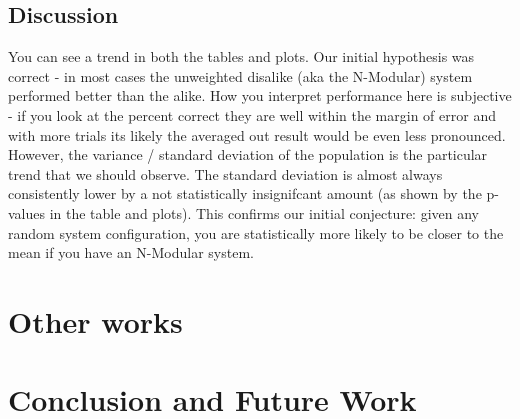 \documentclass[article]{IEEEtran}
\begin{document}
\subsection{Discussion}
\par You can see a trend in both the tables and plots. Our initial hypothesis was correct - in most cases the unweighted disalike (aka the N-Modular) system performed better than the alike. How you interpret performance here is subjective - if you look at the percent correct they are well within the margin of error and with more trials its likely the averaged out result would be even less pronounced. However, the variance / standard deviation of the population is the particular trend that we should observe. The standard deviation is almost always consistently lower by a not statistically insignifcant amount (as shown by the p-values in the table and plots). This confirms our initial conjecture: given any random system configuration, you are statistically more likely to be closer to the mean if you have an N-Modular system.

\section{Other works}
\section{Conclusion and Future Work}
\end{document}
